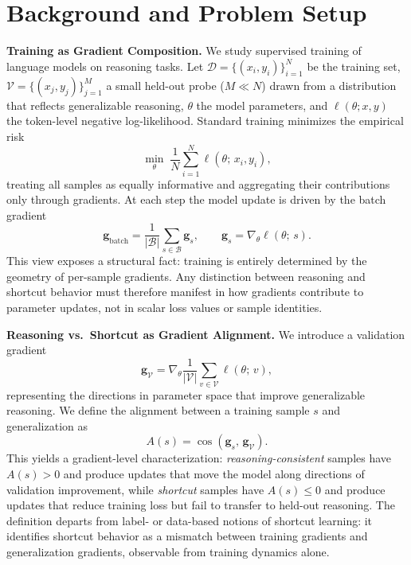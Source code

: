 \vspace{-0.2cm}
\section{Background and Problem Setup}

\textbf{Training as Gradient Composition.}
We study supervised training of language models on reasoning tasks. Let $\mathcal{D}=\{(x_i,y_i)\}_{i=1}^{N}$ be the training set, $\mathcal{V}=\{(x_j,y_j)\}_{j=1}^{M}$ a small held-out probe ($M\!\ll\!N$) drawn from a distribution that reflects generalizable reasoning, $\theta$ the model parameters, and $\ell(\theta;x,y)$ the token-level negative log-likelihood. Standard training minimizes the empirical risk
\begin{equation}
    \min_{\theta} \; \frac{1}{N} \sum_{i=1}^{N} \ell(\theta;\, x_i, y_i),
\end{equation}
treating all samples as equally informative and aggregating their contributions only through gradients. At each step the model update is driven by the batch gradient
\begin{equation}
    \mathbf{g}_{\mathrm{batch}} = \frac{1}{|\mathcal{B}|} \sum_{s \in \mathcal{B}} \mathbf{g}_s, \qquad \mathbf{g}_s = \nabla_\theta \ell(\theta;\,s).
\end{equation}
This view exposes a structural fact: training is entirely determined by the geometry of per-sample gradients. Any distinction between reasoning and shortcut behavior must therefore manifest in how gradients contribute to parameter updates, not in scalar loss values or sample identities.

\textbf{Reasoning vs.\ Shortcut as Gradient Alignment.}
We introduce a validation gradient
\begin{equation}
    \mathbf{g}_{\mathcal{V}} = \nabla_\theta \frac{1}{|\mathcal{V}|} \sum_{v \in \mathcal{V}} \ell(\theta;\, v),
\end{equation}
representing the directions in parameter space that improve generalizable reasoning. We define the alignment between a training sample $s$ and generalization as
\begin{equation}
    A(s) = \cos(\mathbf{g}_s,\, \mathbf{g}_{\mathcal{V}}).
\end{equation}
This yields a gradient-level characterization: \emph{reasoning-consistent} samples have $A(s)>0$ and produce updates that move the model along directions of validation improvement, while \emph{shortcut} samples have $A(s)\leq 0$ and produce updates that reduce training loss but fail to transfer to held-out reasoning. The definition departs from label- or data-based notions of shortcut learning: it identifies shortcut behavior as a mismatch between training gradients and generalization gradients, observable from training dynamics alone.

